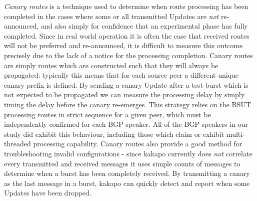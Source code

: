 	{\it Canary routes} is a technique used to determine when route processing has
been completed in the cases where some or all transmitted Updates are {\it not}
re-announced, and also simply for confidence that an experimental phase has
fully completed.
Since in real world operation it is often the case that received routes will
not be preferred and re-announced, it is difficult to measure this
outcome precisely due to the lack of a notice for the processing completion.
Canary routes are simply routes which are
constructed such that they will always be propagated: typically this means that
for each source peer a different unique canary prefix is defined.  By sending
a canary Update after a test burst which is not expected to be propagated we
can measure the processing delay by simply timing the delay before the canary
re-emerges.  This strategy relies on the BSUT processing routes in strict
sequence for a given peer, which must be independently confirmed for each BGP
speaker.  All of the BGP speakers in our study did exhibit this behaviour,
including those which claim or exhibit multi-threaded processing capability.
Canary routes also provide a good method for troubleshooting invalid
configurations - since kakapo currently does {\it not} correlate every
transmitted and received messages it uses simple counts of messages to
determine when a burst has been completely received.  By transmitting a canary
as the last message in a burst, kakapo can quickly detect and report when some
Updates have been dropped.

